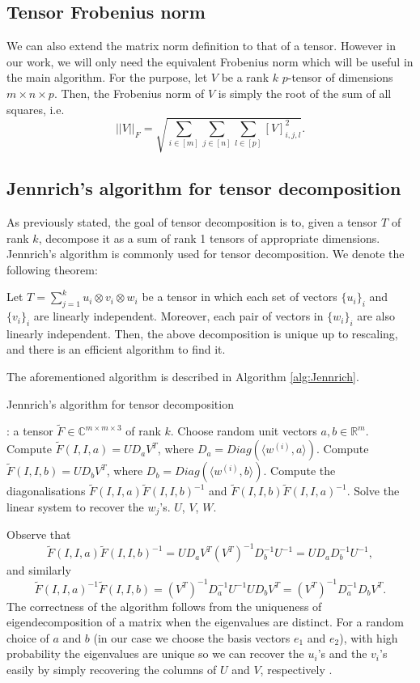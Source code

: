 \subsection{Tensor Frobenius norm}
We can also extend the matrix norm definition to that of a tensor. However in our work, we will only need the equivalent Frobenius norm which will be useful in the main algorithm. For the purpose, let $V$ be a rank $k$ $p$-tensor of dimensions $m\times n\times p$. Then, the Frobenius norm of $V$ is simply the root of the sum of all squares, i.e.
\begin{equation}
    ||V||_F=\sqrt{\sum_{i\in[m]}\sum_{j\in[n]}\sum_{l\in[p]}[V]_{i,j,l}^2}.
\end{equation}
\subsection{Jennrich's algorithm for tensor decomposition}
As previously stated, the goal of tensor decomposition is to, given a tensor $T$ of rank $k$, decompose it as a sum of rank 1 tensors of appropriate dimensions. Jennrich's algorithm is commonly used for tensor decomposition. We denote the following theorem:
\begin{theorem}
    Let $T=\sum_{j=1}^k u_i\otimes v_i\otimes w_i$ be a tensor in which each set of vectors $\{u_i\}_i$ and $\{v_i\}_i$ are linearly independent. Moreover, each pair of vectors in $\{w_i\}_i$ are also linearly independent. Then, the above decomposition is unique up to rescaling, and there is an efficient algorithm to find it.
\end{theorem}
The aforementioned algorithm is described in Algorithm \ref{alg:Jennrich}.
\begin{algorithm}
    \caption{Jennrich's algorithm for tensor decomposition}
    \label{alg:Jennrich}
    \begin{algorithmic}
        : a tensor $\widetilde{F}\in\mathbb{C}^{m\times m\times 3}$ of rank $k$.
        \State Choose random unit vectors $a,b\in\mathbb{R}^m$.
        \State Compute $\widetilde{F}(I,I,a)=UD_aV^T$, where $D_a=Diag(\langle w^{(i)},a\rangle)$.
        \State Compute $\widetilde{F}(I,I,b)=UD_bV^T$, where $D_b=Diag(\langle w^{(i)},b\rangle)$.
        \State Compute the diagonalisations $\widetilde{F}(I,I,a)\widetilde{F}(I,I,b)^{-1}$ and $\widetilde{F}(I,I,b)\widetilde{F}(I,I,a)^{-1}$.
        \State Solve the linear system to recover the $w_j$'s.
         $U$, $V$, $W$.
    \end{algorithmic}
\end{algorithm}\par
Observe that $$\widetilde{F}(I,I,a)\widetilde{F}(I,I,b)^{-1}=UD_aV^T(V^T)^{-1}D_b^{-1}U^{-1}=UD_aD_b^{-1}U^{-1},$$ and similarly $$\widetilde{F}(I,I,a)^{-1}\widetilde{F}(I,I,b)=(V^T)^{-1}D_a^{-1}U^{-1}UD_bV^T=(V^T)^{-1}D_a^{-1}D_bV^T.$$ The correctness of the algorithm follows from the uniqueness of eigendecomposition of a matrix when the eigenvalues are distinct. For a random choice of $a$ and $b$ (in our case we choose the basis vectors $e_1$ and $e_2$), with high probability the eigenvalues are unique so we can recover the $u_i$'s and the $v_i$'s easily by simply recovering the columns of $U$ and $V$, respectively \cite{algoToolbox}.